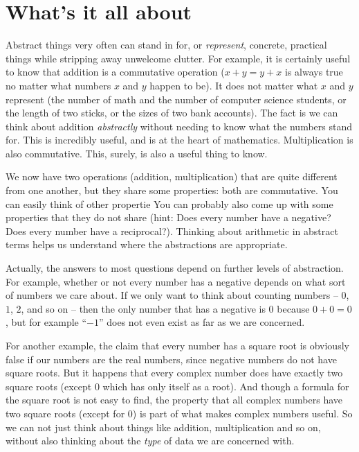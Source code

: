 \chapter{What's it all about}

Abstract things very often can stand in for, or \emph{represent}, concrete, practical things while stripping away unwelcome clutter. For example, it is certainly useful to know that addition is a commutative operation ($x+y = y+x$ is always true no matter what numbers $x$ and $y$ happen to be). It does not matter what $x$ and $y$ represent (the number of math and the number of computer science students, or the length of two sticks, or the sizes of two bank accounts). The fact is we can think about addition \emph{abstractly} without needing to know what the numbers stand for. This is incredibly useful, and is at the heart of mathematics.
Multiplication is also commutative. 
This, surely, is also a useful thing to know. 

We now have two operations (addition, multiplication) that are quite different from one another, but they share some properties: both are commutative. You can easily think of other propertie
You can probably also come up with some properties that they do not share
(hint: Does every number have a negative? 
Does every number have a reciprocal?). 
Thinking about arithmetic in abstract terms helps us understand where the abstractions are appropriate.

Actually, the answers to most questions depend on further levels of abstraction. 
For example, whether or not every number has a negative depends on what sort of numbers we care about. 
If we only want to think about counting numbers -- $0$, $1$, $2$, and so on -- then the only number that has a negative is $0$ because $0+0=0$, but for example ``$-1$'' does not even exist as far as we are concerned.

For another example, the claim that every number has a square root is obviously false if our numbers are the real numbers, since negative numbers do not have square roots. 
But it happens that every complex number does have exactly two square roots (except $0$ which has only itself as a root). 
And though a formula for the square root is not easy to find, the property that all complex numbers have two square roots (except for $0$) is part of what makes complex numbers useful.	
So we can not just think about things like addition, multiplication and so on, without also thinking about the \emph{type} of data we are concerned with.

